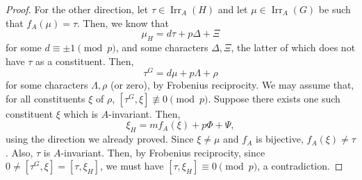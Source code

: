 \documentclass[10pt,a4paper]{amsart}
\DeclareMathOperator{\Irr}{Irr}
\begin{document}
\begin{proof}
	For the other direction, let $\tau \in \Irr_{A}(H)$ and let $\mu \in \Irr_{A}(G)$ be such that $f_A(\mu) = \tau$. Then, we know that
	\begin{equation*}
		\mu_H = d\tau + p\Delta + \Xi
	\end{equation*}
	for some $d \equiv \pm 1 \pmod{p}$, and some characters $\Delta, \Xi$, the latter of which does not have $\tau$ as a constituent. Then,
	\begin{equation*}
		\tau^G = d\mu + p\Lambda + \rho
	\end{equation*}
	for some characters $\Lambda, \rho$ (or zero), by Frobenius reciprocity. We may assume that, for all constituents $\xi$ of $\rho$, $[\tau^G, \xi] \not \equiv 0 \pmod{p}$. Suppose there exists one such constituent $\xi$ which is $A$-invariant. Then,
	\begin{equation*}
		\xi_H = mf_A(\xi) + p\Phi + \Psi,
	\end{equation*}
	using the direction we already proved. Since $\xi \neq \mu$ and $f_A$ is bijective, $f_A(\xi) \neq \tau$. Also, $\tau$ is $A$-invariant. Then, by Frobenius reciprocity, since $0 \neq [\tau^G, \xi] = [\tau, \xi_H]$, we must have $[\tau, \xi_H] \equiv 0 \pmod{p}$, a contradiction.
\end{proof}
\end{document}
